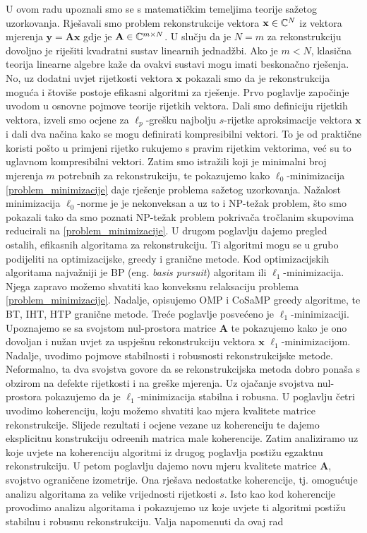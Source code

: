 \documentclass[a4paper,twoside,12pt]{memoir} %
\newcommand{\vect}[1]{\mathbf{#1}}
\renewcommand{\vec}{\vect}
\begin{document}
\begin{sazetak}
    U ovom radu upoznali smo se s matemati\v{c}kim temeljima teorije sa\v{z}etog uzorkovanja. Rje\v{s}avali smo problem rekonstrukcije vektora $\vec x \in \C^N$ iz vektora mjerenja $\vec y = \vec {Ax}$ gdje je $\vec A \in \C^{m \times N}$. U slu\v{c}ju da je $N = m$ za rekonstrukciju dovoljno je rije\v{s}iti kvadratni sustav linearnih jednad\v{z}bi. Ako je $m < N$, klasi\v{c}na teorija linearne algebre ka\v{z}e da ovakvi sustavi mogu imati beskona\v{c}no rje\v{s}enja. No, uz dodatni uvjet rijetkosti vektora $\vec x$ pokazali smo da je rekonstrukcija mogu\'ca i \v{s}tovi\v{s}e postoje efikasni algoritmi za rje\v{s}enje. Prvo poglavlje zapo\v{c}inje uvodom u osnovne pojmove teorije rijetkih vektora. Dali smo definiciju rijetkih vektora, izveli smo ocjene za $\ell_p$-gre\v{s}ku najbolju $s$-rijetke aproksimacije vektora $\vec x$ i dali dva na\v{c}ina kako se mogu definirati kompresibilni vektori. To je od prakti\v{c}ne koristi po\v{s}to u primjeni rijetko rukujemo s pravim rijetkim vektorima, ve\'c su to uglavnom kompresibilni vektori. Zatim smo istra\v{z}ili koji je minimalni broj mjerenja $m$ potrebnih za rekonstrukciju, te pokazujemo kako $\ell_0$-minimizacija \eqref{problem_minimizacije} daje rje\v{s}enje problema sa\v{z}etog uzorkovanja. Na\v{z}alost minimizacija $\ell_0$-norme je je nekonveksan a uz to i NP-te\v{z}ak problem, \v{s}to smo pokazali tako da smo poznati NP-te\v{z}ak problem pokriva\v{c}a tro\v{c}lanim skupovima reducirali na \eqref{problem_minimizacije}. U drugom poglavlju dajemo pregled ostalih, efikasnih algoritama za rekonstrukciju. Ti algoritmi mogu se u grubo podijeliti na optimizacijske, greedy i grani\v{c}ne metode. Kod optimizacijskih algoritama najva\v{z}niji je BP (eng. \textit{basis pursuit}) algoritam ili $\ell_1$-minimizacija. Njega zapravo mo\v{z}emo shvatiti kao konveksnu relaksaciju problema \eqref{problem_minimizacije}. Nadalje, opisujemo OMP i CoSaMP greedy algoritme, te BT, IHT, HTP grani\v{c}ne metode. Tre\'ce poglavlje posve\'ceno je $\ell_1$-minimizaciji. Upoznajemo se sa svojstom nul-prostora matrice $\vec A$ te pokazujemo kako je ono dovoljan i nu\v{z}an uvjet za uspje\v{s}nu rekonstrukciju vektora $\vec x$ $\ell_1$-minimizacijom. Nadalje, uvodimo pojmove stabilnosti i robusnosti rekonstrukcijske metode. Neformalno, ta dva svojstva govore da se rekonstrukcijska metoda dobro pona\v{s}a s obzirom na defekte rijetkosti i na gre\v{s}ke mjerenja. Uz oja\v{c}anje svojstva nul-prostora pokazujemo da je $\ell_1$-minimizacija stabilna i robusna. U poglavlju \v{c}etri uvodimo koherenciju, koju mo\v{z}emo shvatiti kao mjera kvalitete matrice rekonstrukcije. Slijede rezultati i ocjene vezane uz koherenciju te dajemo eksplicitnu konstrukciju odre\dj enih matrica male koherencije. Zatim analiziramo uz koje uvjete na koherenciju algoritmi iz drugog poglavlja posti\v{z}u egzaktnu rekonstrukciju. U petom poglavlju dajemo novu mjeru kvalitete matrice $\vec A$, svojstvo ograni\v{c}ene izometrije. Ona rje\v{s}ava nedostatke koherencije, tj. omogu\'cuje analizu algoritama za velike vrijednosti rijetkosti $s$. Isto kao kod koherencije provodimo analizu algoritama i pokazujemo uz koje uvjete ti algoritmi posti\v{z}u stabilnu i robusnu rekonstrukciju. Valja napomenuti da ovaj rad 
\end{sazetak}
\end{document}
